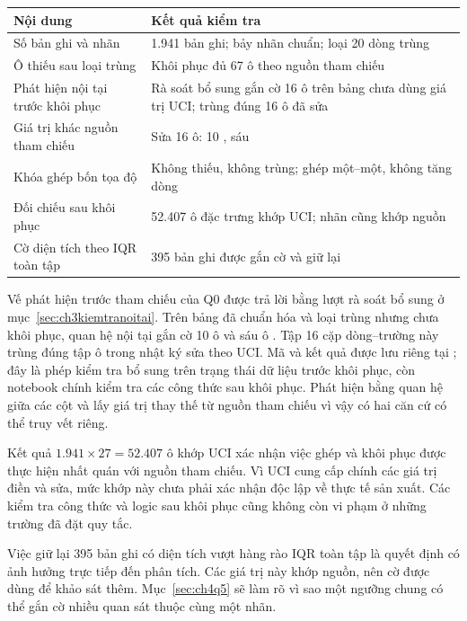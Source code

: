 \begin{center}\begin{minipage}{\linewidth}
\label{tab:ch4chatluong}
\small{}
\begin{tabularx}{\linewidth}{@{}Y Y@{}}
\toprule
Nội dung & Kết quả kiểm tra \\
\midrule
Số bản ghi và nhãn & 1.941 bản ghi; bảy nhãn chuẩn; loại 20 dòng trùng \\
Ô thiếu sau loại trùng & Khôi phục đủ 67 ô theo nguồn tham chiếu \\
Phát hiện nội tại trước khôi phục & Rà soát bổ sung gắn cờ 16 ô trên bảng chưa dùng giá trị UCI; trùng đúng 16 ô đã sửa \\
Giá trị khác nguồn tham chiếu & Sửa 16 ô: 10 , sáu  \\
Khóa ghép bốn tọa độ & Không thiếu, không trùng; ghép một--một, không tăng dòng \\
Đối chiếu sau khôi phục & 52.407 ô đặc trưng khớp UCI; nhãn cũng khớp nguồn \\
Cờ diện tích theo IQR toàn tập & 395 bản ghi được gắn cờ và giữ lại \\
\bottomrule
\end{tabularx}
\end{minipage}\end{center}

Vế phát hiện trước tham chiếu của Q0 được trả lời bằng lượt rà soát bổ sung ở mục~\ref{sec:ch3kiemtranoitai}. Trên bảng đã chuẩn hóa và loại trùng nhưng chưa khôi phục, quan hệ nội tại gắn cờ 10 ô  và sáu ô . Tập 16 cặp dòng--trường này trùng đúng tập ô trong nhật ký sửa theo UCI. Mã và kết quả được lưu riêng tại ; đây là phép kiểm tra bổ sung trên trạng thái dữ liệu trước khôi phục, còn notebook chính kiểm tra các công thức sau khôi phục. Phát hiện bằng quan hệ giữa các cột và lấy giá trị thay thế từ nguồn tham chiếu vì vậy có hai căn cứ có thể truy vết riêng.

Kết quả $1.941\times27=52.407$ ô khớp UCI xác nhận việc ghép và khôi phục được thực hiện nhất quán với nguồn tham chiếu. Vì UCI cung cấp chính các giá trị điền và sửa, mức khớp này chưa phải xác nhận độc lập về thực tế sản xuất. Các kiểm tra công thức và logic sau khôi phục cũng không còn vi phạm ở những trường đã đặt quy tắc.

Việc giữ lại 395 bản ghi có diện tích vượt hàng rào IQR toàn tập là quyết định có ảnh hưởng trực tiếp đến phân tích. Các giá trị này khớp nguồn, nên cờ được dùng để khảo sát thêm. Mục~\ref{sec:ch4q5} sẽ làm rõ vì sao một ngưỡng chung có thể gắn cờ nhiều quan sát thuộc cùng một nhãn.

